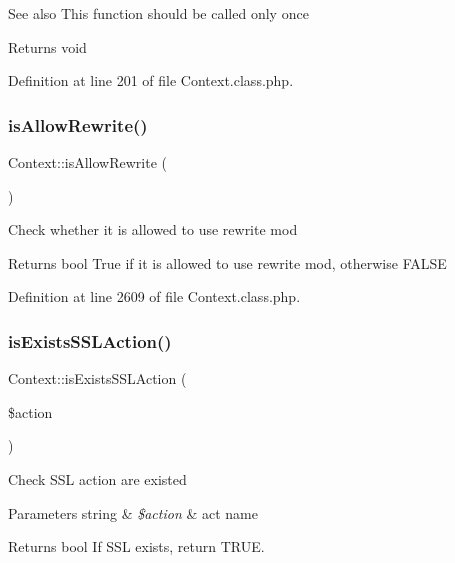 \begin{DoxySeeAlso}{See also}
This function should be called only once 
\end{DoxySeeAlso}
\begin{DoxyReturn}{Returns}
void 
\end{DoxyReturn}


Definition at line 201 of file Context.\+class.\+php.

\mbox{\label{classContext_aa11482b69f0892e9e8013e08c9914ff4}} 
\subsubsection{\texorpdfstring{is\+Allow\+Rewrite()}{isAllowRewrite()}}
{\footnotesize\ttfamily Context\+::is\+Allow\+Rewrite (\begin{DoxyParamCaption}{ }\end{DoxyParamCaption})}

Check whether it is allowed to use rewrite mod

\begin{DoxyReturn}{Returns}
bool True if it is allowed to use rewrite mod, otherwise F\+A\+L\+SE 
\end{DoxyReturn}


Definition at line 2609 of file Context.\+class.\+php.

\mbox{\label{classContext_ada5b689e4d143f371c38091b87cfd864}} 
\subsubsection{\texorpdfstring{is\+Exists\+S\+S\+L\+Action()}{isExistsSSLAction()}}
{\footnotesize\ttfamily Context\+::is\+Exists\+S\+S\+L\+Action (\begin{DoxyParamCaption}\item[{}]{\$action }\end{DoxyParamCaption})}

Check S\+SL action are existed


\begin{DoxyParams}[1]{Parameters}
string & {\em \$action} & act name \\
\hline
\end{DoxyParams}
\begin{DoxyReturn}{Returns}
bool If S\+SL exists, return T\+R\+UE. 
\end{DoxyReturn}


